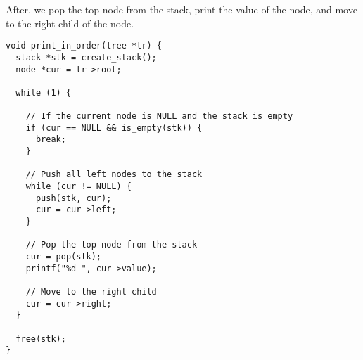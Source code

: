 \documentclass[a4paper,11pt]{article}
\begin{document}
After, 
we pop the top node from the stack, print the value of the node, and move to the
right child of the node.

\begin{verbatim}
void print_in_order(tree *tr) {
  stack *stk = create_stack();
  node *cur = tr->root;

  while (1) {

    // If the current node is NULL and the stack is empty
    if (cur == NULL && is_empty(stk)) {
      break;
    }         
    
    // Push all left nodes to the stack
    while (cur != NULL) {
      push(stk, cur);
      cur = cur->left;
    }

    // Pop the top node from the stack
    cur = pop(stk);
    printf("%d ", cur->value);

    // Move to the right child
    cur = cur->right;
  }

  free(stk);
}
\end{verbatim}
\end{document}
